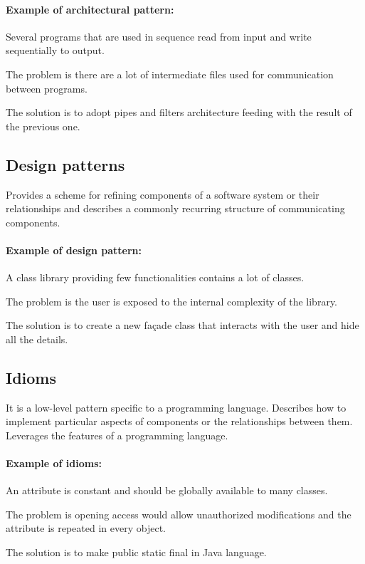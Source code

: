 \paragraph{Example of architectural pattern:} Several programs that are used in sequence read from
input and write sequentially to output.

The problem is there are a lot of intermediate files used for
communication between programs.

The solution is to adopt pipes and filters architecture feeding with the result of the previous one.

\subsection{Design patterns}

Provides a scheme for refining components of a software system or their relationships and describes a commonly recurring structure of
communicating components.

\paragraph{Example of design pattern:} A class library providing few functionalities contains a
lot of classes.

The problem is the user is exposed to the internal complexity of the library.

The solution is to create a new façade class that interacts with the user
and hide all the details.

\subsection{Idioms}

It is a low-level pattern specific to a programming
language. Describes how to implement particular aspects of
components or the relationships between them.
Leverages the features of a programming
language.

\paragraph{Example of idioms:} An attribute is constant and should be globally
available to many classes.

The problem is opening access would allow unauthorized
modifications and the attribute is repeated in every object.

The solution is to make public static final in Java language.

